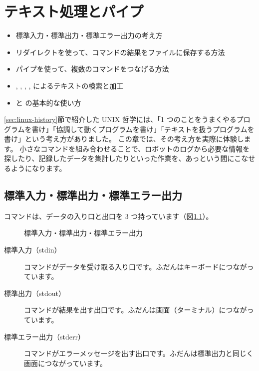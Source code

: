 \chapter{テキスト処理とパイプ}
\label{chap:text_pipe}

\begin{goalbox}
  \begin{itemize}
    \item 標準入力・標準出力・標準エラー出力の考え方
    \item リダイレクトを使って、コマンドの結果をファイルに保存する方法
    \item パイプを使って、複数のコマンドをつなげる方法
    \item {}, , , ,  によるテキストの検索と加工
    \item {} と  の基本的な使い方
  \end{itemize}
\end{goalbox}

\ref{sec:linux-history}節で紹介した UNIX 哲学には、「1 つのことをうまくやるプログラムを書け」「協調して動くプログラムを書け」「テキストを扱うプログラムを書け」という考え方がありました。
この章では、その考え方を実際に体験します。
小さなコマンドを組み合わせることで、ロボットのログから必要な情報を探したり、記録したデータを集計したりといった作業を、あっという間にこなせるようになります。

\section{標準入力・標準出力・標準エラー出力}
\label{sec:text-pipe-stream}

コマンドは、データの入り口と出口を 3 つ持っています（図\ref{fig:text-pipe-streams}）。

\begin{figure}[tb]
  \centering
  
  \caption{標準入力・標準出力・標準エラー出力}
  \label{fig:text-pipe-streams}
\end{figure}

\begin{description}
  \item[標準入力（stdin）] コマンドがデータを受け取る入り口です。ふだんはキーボードにつながっています。
  \item[標準出力（stdout）] コマンドが結果を出す出口です。ふだんは画面（ターミナル）につながっています。
  \item[標準エラー出力（stderr）] コマンドがエラーメッセージを出す出口です。ふだんは標準出力と同じく画面につながっています。
\end{description}

